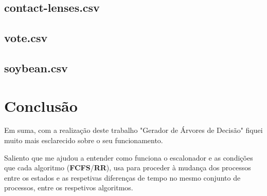 \documentclass[11pt]{article}   %
\begin{document}
\subsection{contact-lenses.csv}

\subsection{vote.csv}

\subsection{soybean.csv}
\section{Conclusão} %
\hspace{0,5cm}Em suma, com a realização deste trabalho "Gerador de Árvores de Decisão" fiquei muito mais esclarecido sobre o seu funcionamento. \par
Saliento que me ajudou a entender como funciona o escalonador e as condições que cada algoritmo (\textbf{FCFS}/\textbf{RR}), usa para proceder à mudança dos processos entre os estados e as respetivas diferenças de tempo no mesmo conjunto de processos, entre os respetivos algoritmos.  
\end{document}
